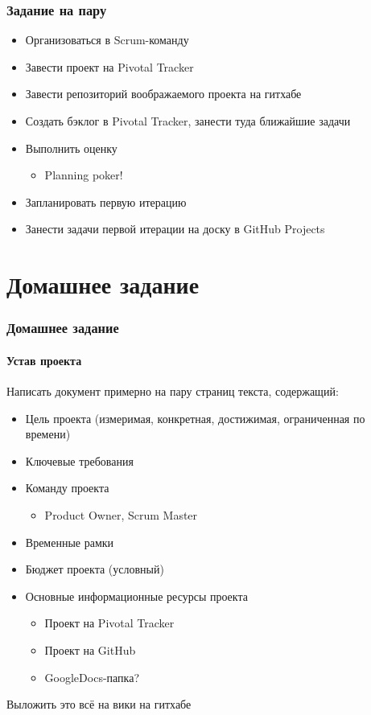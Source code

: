 \documentclass[xetex,mathserif,serif]{beamer}
\begin{document}
	\begin{frame}
		\frametitle{Задание на пару}
		\begin{itemize}
			\item Организоваться в Scrum-команду
			\item Завести проект на Pivotal Tracker
			\item Завести репозиторий воображаемого проекта на гитхабе
			\item Создать бэклог в Pivotal Tracker, занести туда ближайшие задачи
			\item Выполнить оценку
			\begin{itemize}
				\item Planning poker!
			\end{itemize}
			\item Запланировать первую итерацию
			\item Занести задачи первой итерации на доску в GitHub Projects
		\end{itemize}
	\end{frame}

	\section{Домашнее задание}
	
	\begin{frame}
		\frametitle{Домашнее задание}
		\framesubtitle{Устав проекта}
		Написать документ примерно на пару страниц текста, содержащий:
		\begin{itemize}
			\item Цель проекта (измеримая, конкретная, достижимая, ограниченная по времени)
			\item Ключевые требования
			\item Команду проекта
			\begin{itemize}
				\item Product Owner, Scrum Master
			\end{itemize}
			\item Временные рамки
			\item Бюджет проекта (условный)
			\item Основные информационные ресурсы проекта
			\begin{itemize}
				\item Проект на Pivotal Tracker
				\item Проект на GitHub
				\item GoogleDocs-папка?
			\end{itemize}
		\end{itemize}
		Выложить это всё на вики на гитхабе
	\end{frame}
\end{document}
